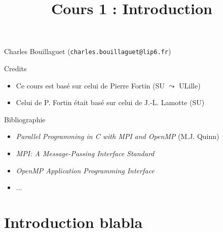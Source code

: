 \documentclass[xcolor={x11names,svgnames}]{beamer}
\title{Cours 1 : Introduction}
\begin{document}
\begin{frame}[fragile]

  Charles Bouillaguet (\verb|charles.bouillaguet@lip6.fr|)
  
  \begin{exampleblock}{Credits}
    \begin{itemize}
    \item Ce cours est basé sur celui de Pierre Fortin (SU $\leadsto$ ULille)
    \item Celui de P. Fortin était basé sur celui de  J.-L. Lamotte (SU)
    \end{itemize}
  \end{exampleblock}

  \begin{block}{Bibliographie}
    \begin{itemize}
    \item {\small \textit{Parallel Programming in C with MPI and OpenMP} (M.J. Quinn)}
    \item \textit{MPI: A Message-Passing Interface Standard}
    \item \textit{OpenMP Application Programming Interface}
    \item ...
    \end{itemize}
  \end{block}


  
\end{frame}



\section{Introduction blabla}

\begin{frame}[label=title]
  \titlepage
\end{frame}
 
\end{document}
